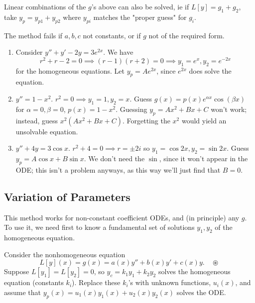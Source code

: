 \begin{remark}
    Linear combinations of the $g$'s above can also be solved, ie if $L[y] = g_1 + g_2$, take $y_p = y_{p1} + y_{p2}$ where $y_{pi}$ matches the "proper guess" for $g_i$.
\end{remark}
\begin{remark}
    The method fails if $a, b, c$ not constants, or if $g$ not of the required form.
\end{remark}

\begin{example}
    \begin{enumerate}
        \item Consider $y'' + y' - 2y = 3e^{2x}$. We have \[
    r^2 + r - 2 = 0 \implies (r-1)(r+2) = 0 \implies y_1 = e^{x}, y_2 = e^{-2x}    
    \]
    for the homogeneous equations. Let $y_p = Ae^{2x}$, since $e^{2x}$ does solve the equation.
    \item $y'' = 1-x^2$. $r^2 = 0 \implies y_1 = 1, y_2 = x$. Guess $g(x) = p(x)e^{\alpha x} \cos (\beta x)$ for $\alpha = 0, \beta = 0$, $p(x) = 1-x^2$. Guessing $y_p = Ax^2 + Bx +C$ won't work; instead, guess $x^2(Ax^2 + Bx + C)$. Forgetting the $x^2$ would yield an unsolvable equation.
    \item $y''+4y=3\cos x$. $r^2 + 4 = 0 \implies r = \pm 2 i$ so $y_1 = \cos 2x, y_2 = \sin 2x$. Guess $y_p = A \cos x + B \sin x$. We don't need the $\sin$, since it won't appear in the ODE; this isn't a problem anyways, as this way we'll just find that $B =0$.
    \end{enumerate}
\end{example}

\subsection{Variation of Parameters}

This method works for non-constant coefficient ODEs, and (in principle) any $g$. To use it, we need first to know a fundamental set of solutions $y_1, y_2$ of the homogeneous equation.

Consider the nonhomogeneous equation \[
L[y](x) = g(x) = a(x)y''+b(x)y'+c(x)y. \quad \circledast
\]
Suppose $L[y_1] = L[y_2] = 0$, so $y_c = k_1 y_1 + k_2 y_2$ solves the homogeneous equation (constants $k_i$). Replace these $k_i$'s with unknown functions, $u_i(x)$, and assume that $y_p(x) = u_1(x)y_1(x) + u_2(x)y_2(x)$ solves the ODE. 

